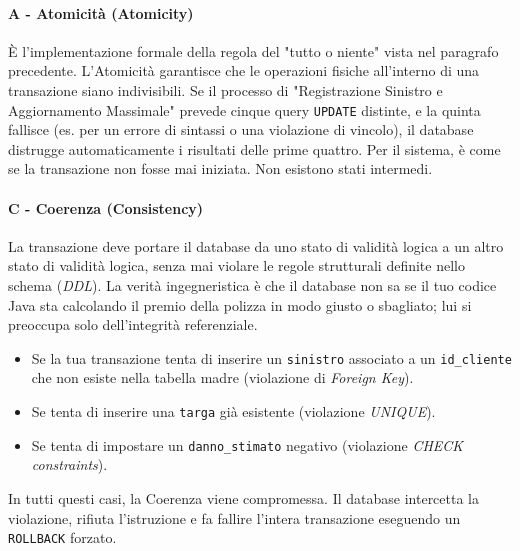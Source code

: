 \paragraph{A - Atomicità (Atomicity)}
È l'implementazione formale della regola del "tutto o niente" vista nel paragrafo precedente. L'Atomicità garantisce che le operazioni fisiche all'interno di una transazione siano indivisibili. 
Se il processo di "Registrazione Sinistro e Aggiornamento Massimale" prevede cinque query \texttt{UPDATE} distinte, e la quinta fallisce (es. per un errore di sintassi o una violazione di vincolo), il database distrugge automaticamente i risultati delle prime quattro. Per il sistema, è come se la transazione non fosse mai iniziata. Non esistono stati intermedi.

\paragraph{C - Coerenza (Consistency)}
La transazione deve portare il database da uno stato di validità logica a un altro stato di validità logica, senza mai violare le regole strutturali definite nello schema (\textit{DDL}). 
La verità ingegneristica è che il database non sa se il tuo codice Java sta calcolando il premio della polizza in modo giusto o sbagliato; lui si preoccupa solo dell'integrità referenziale.
\begin{itemize}
    \item Se la tua transazione tenta di inserire un \texttt{sinistro} associato a un \texttt{id\_cliente} che non esiste nella tabella madre (violazione di \textit{Foreign Key}).
    \item Se tenta di inserire una \texttt{targa} già esistente (violazione \textit{UNIQUE}).
    \item Se tenta di impostare un \texttt{danno\_stimato} negativo (violazione \textit{CHECK constraints}).
\end{itemize}
In tutti questi casi, la Coerenza viene compromessa. Il database intercetta la violazione, rifiuta l'istruzione e fa fallire l'intera transazione eseguendo un \texttt{ROLLBACK} forzato.

